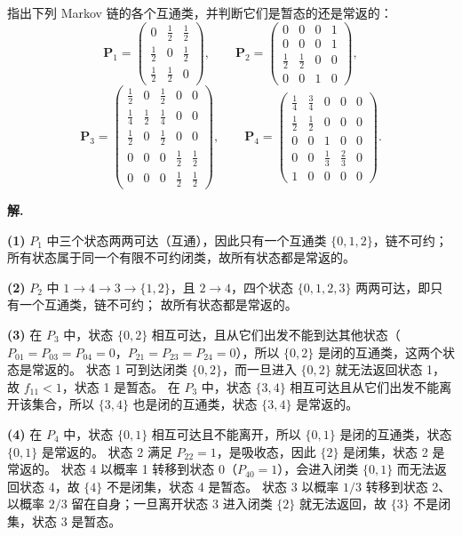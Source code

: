 \documentclass[12pt,a4paper]{article}
\begin{document}
指出下列 Markov 链的各个互通类，并判断它们是暂态的还是常返的：
\[
\mathbf{P}_1=\begin{pmatrix}
0&\frac12&\frac12\\[4pt]
\frac12&0&\frac12\\[4pt]
\frac12&\frac12&0
\end{pmatrix},
\qquad
\mathbf{P}_2=\begin{pmatrix}
0&0&0&1\\
0&0&0&1\\
\frac12&\frac12&0&0\\[4pt]
0&0&1&0
\end{pmatrix},
\]
\[
\mathbf{P}_3=\begin{pmatrix}
\frac12&0&\frac12&0&0\\[4pt]
\frac14&\frac12&\frac14&0&0\\[4pt]
\frac12&0&\frac12&0&0\\[4pt]
0&0&0&\frac12&\frac12\\[4pt]
0&0&0&\frac12&\frac12
\end{pmatrix},
\qquad
\mathbf{P}_4=\begin{pmatrix}
\frac14&\frac34&0&0&0\\[4pt]
\frac12&\frac12&0&0&0\\[4pt]
0&0&1&0&0\\[4pt]
0&0&\frac13&\frac23&0\\[4pt]
1&0&0&0&0
\end{pmatrix}.
\]

\begin{answerbox}
\textbf{解.}

\textbf{(1)}
$P_1$ 中三个状态两两可达（互通），因此只有一个互通类 $\{0,1,2\}$，链不可约；
所有状态属于同一个有限不可约闭类，故所有状态都是常返的。

\textbf{(2)}
$P_2$ 中 $1\to4\to3\to\{1,2\}$，且 $2\to4$，四个状态 $\{0,1,2,3\}$ 两两可达，即只有一个互通类，链不可约；
故所有状态都是常返的。

\textbf{(3)}
在 $P_3$ 中，状态 $\{0, 2\}$ 相互可达，且从它们出发不能到达其他状态（$P_{01}=P_{03}=P_{04}=0$，$P_{21}=P_{23}=P_{24}=0$），所以 $\{0, 2\}$ 是闭的互通类，这两个状态是常返的。
状态 1 可到达闭类 $\{0, 2\}$，而一旦进入 $\{0, 2\}$ 就无法返回状态 1，故 $f_{11}<1$，状态 1 是暂态。
在 $P_3$ 中，状态 $\{3, 4\}$ 相互可达且从它们出发不能离开该集合，所以 $\{3, 4\}$ 也是闭的互通类，状态 $\{3, 4\}$ 是常返的。

\textbf{(4)}
在 $P_4$ 中，状态 $\{0, 1\}$ 相互可达且不能离开，所以 $\{0, 1\}$ 是闭的互通类，状态 $\{0, 1\}$ 是常返的。
状态 2 满足 $P_{22}=1$，是吸收态，因此 $\{2\}$ 是闭集，状态 2 是常返的。
状态 4 以概率 1 转移到状态 0（$P_{40}=1$），会进入闭类 $\{0, 1\}$ 而无法返回状态 4，故 $\{4\}$ 不是闭集，状态 4 是暂态。
状态 3 以概率 $1/3$ 转移到状态 2、以概率 $2/3$ 留在自身；一旦离开状态 3 进入闭类 $\{2\}$ 就无法返回，故 $\{3\}$ 不是闭集，状态 3 是暂态。
\end{answerbox}
\end{document}
